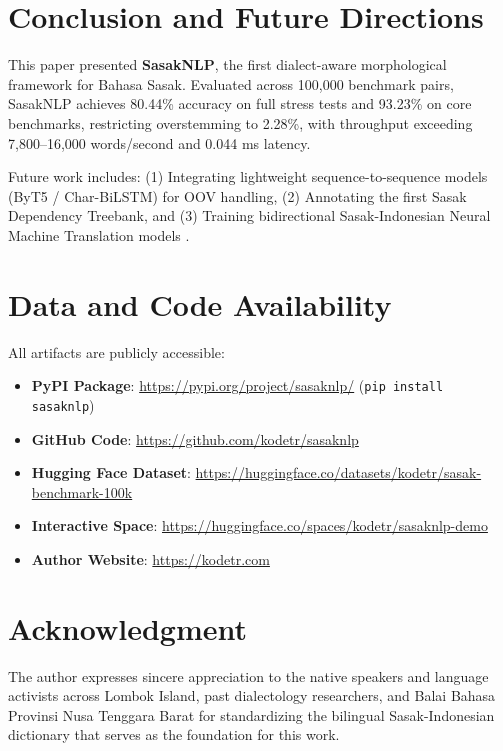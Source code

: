 \documentclass[journal,10pt]{IEEEtran}
\begin{document}
\section{Conclusion and Future Directions}
This paper presented \textbf{SasakNLP}, the first dialect-aware morphological framework for Bahasa Sasak. Evaluated across 100,000 benchmark pairs, SasakNLP achieves 80.44\% accuracy on full stress tests and 93.23\% on core benchmarks, restricting overstemming to 2.28\%, with throughput exceeding 7,800–16,000 words/second and 0.044 ms latency.

Future work includes: (1) Integrating lightweight sequence-to-sequence models (ByT5 / Char-BiLSTM) for OOV handling, (2) Annotating the first Sasak Dependency Treebank, and (3) Training bidirectional Sasak-Indonesian Neural Machine Translation models \cite{aji2022, winata2023, ranathunga2023}.

\section*{Data and Code Availability}
All artifacts are publicly accessible:
\begin{itemize}
    \item \textbf{PyPI Package}: \url{https://pypi.org/project/sasaknlp/} (\texttt{pip install sasaknlp})
    \item \textbf{GitHub Code}: \url{https://github.com/kodetr/sasaknlp}
    \item \textbf{Hugging Face Dataset}: \url{https://huggingface.co/datasets/kodetr/sasak-benchmark-100k}
    \item \textbf{Interactive Space}: \url{https://huggingface.co/spaces/kodetr/sasaknlp-demo}
    \item \textbf{Author Website}: \url{https://kodetr.com}
\end{itemize}

\section*{Acknowledgment}
The author expresses sincere appreciation to the native speakers and language activists across Lombok Island, past dialectology researchers, and Balai Bahasa Provinsi Nusa Tenggara Barat for standardizing the bilingual Sasak-Indonesian dictionary that serves as the foundation for this work.



\end{document}
